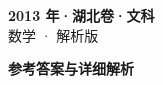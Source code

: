 \documentclass[zihao=-4, a4paper]{ctexart}
\begin{document}
\begin{center}
  {\Large\bfseries 2013 年·湖北卷·文科}\\[4pt]
  {\large 数学 · 解析版}
\end{center}
\medskip
{}

\clearpage
{}
\begin{center}{\Large\bfseries 参考答案与详细解析}\end{center}
\medskip

\end{document}
